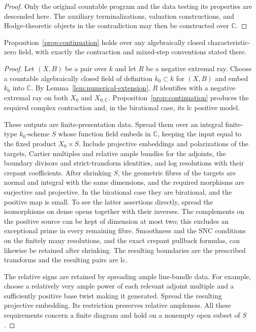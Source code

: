 \begin{proof}
Only the original countable program and the data testing its
properties are descended here.  The auxiliary terminalizations,
valuation constructions, and Hodge-theoretic objects in the
contradiction may then be constructed over $\mathbb C$.
\end{proof}

\begin{lemma}\label{lem:finite-existence-transfer}
Proposition~\ref{prop:continuation} holds over any algebraically
closed characteristic-zero field, with exactly the contraction
and mixed-step conventions stated there.
\end{lemma}

\begin{proof}
Let $(X,B)$ be a pair over $k$ and let $R$ be a negative extremal
ray.  Choose a countable algebraically closed field of
definition $k_0\subset k$ for $(X,B)$ and embed $k_0$ into
$\mathbb C$.  By Lemma~\ref{lem:numerical-extension}, $R$
identifies with a negative extremal ray on both $X_0$ and
$X_{0,\mathbb C}$.  Proposition~\ref{prop:continuation} produces
the required complex contraction and, in the birational case,
its lc positive model.

These outputs are finite-presentation data.  Spread them over
an integral finite-type $k_0$-scheme $S$ whose function field
embeds in $\mathbb C$, keeping the input equal to the fixed
product $X_0\times S$.  Include projective embeddings and
polarizations of the targets, Cartier multiples and relative
ample bundles for the adjoints, the boundary divisors and
strict-transform identities, and log resolutions with their
crepant coefficients.  After shrinking $S$, the geometric
fibres of the targets are normal and integral with the same
dimensions, and the required morphisms are surjective and
projective.  In the birational case they are birational, and
the positive map is small.  To see the latter assertions
directly, spread the isomorphisms on dense opens together with
their inverses.  The complements on the positive source can
be kept of dimension at most two; this excludes an exceptional
prime in every remaining fibre.  Smoothness and the SNC
conditions on the finitely many resolutions, and the exact
crepant pullback formulas, can likewise be retained after
shrinking.  The resulting boundaries are the prescribed
transforms and the resulting pairs are lc.

The relative signs are retained by spreading ample line-bundle data.
For example, choose a relatively very ample power of each
relevant adjoint multiple and a sufficiently positive base
twist making it generated.  Spread the resulting projective
embedding.  Its restriction preserves relative ampleness.
All these requirements concern a finite diagram and hold
on a nonempty open subset of $S$.


\end{proof}
